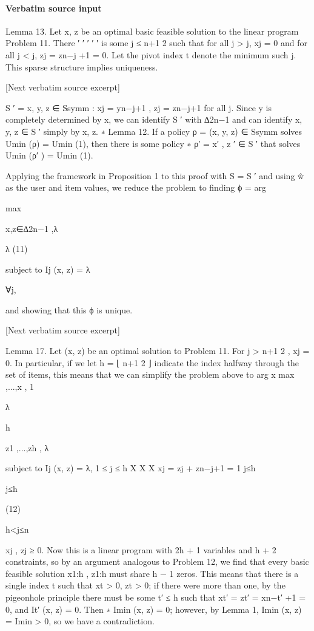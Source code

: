 \documentclass[10pt]{article}
\begin{document}
\paragraph{Verbatim source input}
\begin{ReviewVerbatim}
Lemma 13. Let x, z be an optimal basic feasible solution to the linear program Problem 11. There
′
′
′
′
′
is some j ≤ n+1
2 such that for all j > j, xj = 0 and for all j < j, zj = zn−j +1 = 0. Let the
pivot index t denote the minimum such j.
This sparse structure implies uniqueness.

[Next verbatim source excerpt]

S ′ = {x, y, z ∈ Ssymm : xj = yn−j+1 , zj = zn−j+1 for all j}.
Since y is completely determined by x, we can identify S ′ with ∆2n−1 and can identify x, y, z ∈ S ′
simply by x, z.
∗
Lemma 12. If a policy ρ = (x, y, z) ∈ Ssymm solves Umin (ρ) = Umin
(1), then there is some policy
∗
ρ′ = x′ , z ′ ∈ S ′ that solves Umin (ρ′ ) = Umin
(1).

Applying the framework in Proposition 1 to this proof with S = S ′ and using ŵ as the user and item
values, we reduce the problem to finding
ϕ = arg

max

x,z∈∆2n−1 ,λ

λ
(11)

subject to Ij (x, z) = λ

∀j,

and showing that this ϕ is unique.

[Next verbatim source excerpt]

Lemma 17. Let (x, z) be an optimal solution to Problem 11. For j > n+1
2 , xj = 0.
In particular, if we let h = ⌊ n+1
2 ⌋ indicate the index halfway through the set of items, this means that
we can simplify the problem above to
arg x max
,...,x ,
1

λ

h

z1 ,...,zh ,
λ

subject to Ij (x, z) = λ, 1 ≤ j ≤ h
X
X
X
xj =
zj +
zn−j+1 = 1
j≤h

j≤h

(12)

h<j≤n

xj , zj ≥ 0.
Now this is a linear program with 2h + 1 variables and h + 2 constraints, so by an argument analogous
to Problem 12, we find that every basic feasible solution x1:h , z1:h must share h − 1 zeros. This means
that there is a single index t such that xt > 0, zt > 0; if there were more than one, by the pigeonhole
principle there must be some t′ ≤ h such that xt′ = zt′ = xn−t′ +1 = 0, and It′ (x, z) = 0. Then
∗
Imin (x, z) = 0; however, by Lemma 1, Imin (x, z) = Imin
> 0, so we have a contradiction.
\end{ReviewVerbatim}
\end{document}
